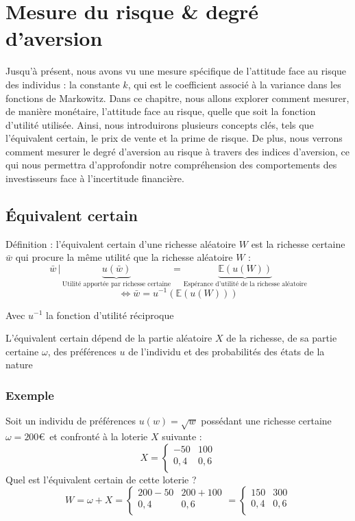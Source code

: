 \documentclass[a4paper, 12pt]{report}
\begin{document}
\chapter{Mesure du risque \& degré d'aversion}

Jusqu'à présent, nous avons vu une mesure spécifique de l'attitude face au risque des individus : la constante $k$, qui est le coefficient associé à la variance dans les fonctions de Markowitz. Dans ce chapitre, nous allons explorer comment mesurer, de manière monétaire, l'attitude face au risque, quelle que soit la fonction d'utilité utilisée. Ainsi, nous introduirons plusieurs concepts clés, tels que l'équivalent certain, le prix de vente et la prime de risque. De plus, nous verrons comment mesurer le degré d'aversion au risque à travers des indices d'aversion, ce qui nous permettra d'approfondir notre compréhension des comportements des investisseurs face à l'incertitude financière.

\section{Équivalent certain}

Définition : l'équivalent certain d'une richesse aléatoire $W$ est la richesse certaine $\bar{w}$ qui procure la même utilité que la richesse aléatoire $W$ :
$$
\bar{w} \,|\, \underbrace{u(\bar{w})}_{\text{Utilité apportée par richesse
		certaine}}= \underbrace{\mathbb{E}\left( u(W) \right)}_{\text{Espérance d'utilité de la
		richesse aléatoire}}
$$
$$
\Leftrightarrow \bar{w}=u^{-1}\left( \mathbb{E}\left( u(W) \right) \right)
$$

Avec $u^{-1}$ la fonction d'utilité réciproque

L'équivalent certain dépend de la partie aléatoire $X$ de la richesse, de sa partie certaine $\omega$, des préférences $u$ de l'individu et des probabilités des états de la nature

\subsection{Exemple}

Soit un individu de préférences $u(w)=\sqrt{w}$ possédant une richesse certaine $\omega = 200$\euro~et confronté à la loterie $X$ suivante :
$$
X = \left\{\begin{matrix}
	-50 & 100 \\
	0,4 & 0,6 \\
\end{matrix}\right.
$$
Quel est l'équivalent certain de cette loterie ?
$$
W = \omega+X = \left\{\begin{matrix}
	200 -50 & 200+100 \\
	0,4 & 0,6 \\
\end{matrix}\right.= \left\{\begin{matrix}
	150 & 300 \\
	0,4 & 0,6 \\
\end{matrix}\right.
$$
\end{document}
